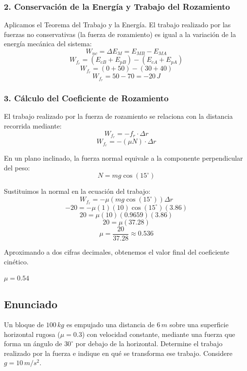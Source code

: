 \documentclass[12pt, a4paper]{article}
\begin{document}
\subsubsection*{2. Conservación de la Energía y Trabajo del Rozamiento}
Aplicamos el Teorema del Trabajo y la Energía. El trabajo realizado por las fuerzas no conservativas (la fuerza de rozamiento) es igual a la variación de la energía mecánica del sistema:
$$ W_{nc} = \Delta E_M = E_{MB} - E_{MA} $$
$$ W_{f_r} = (E_{cB} + E_{pB}) - (E_{cA} + E_{pA}) $$
$$ W_{f_r} = (0 + 50) - (30 + 40) $$
$$ W_{f_r} = 50 - 70 = -20 \, \si{J} $$

\subsubsection*{3. Cálculo del Coeficiente de Rozamiento}
El trabajo realizado por la fuerza de rozamiento se relaciona con la distancia recorrida mediante:
$$ W_{f_r} = -f_r \cdot \Delta r $$
$$ W_{f_r} = -(\mu N) \cdot \Delta r $$

En un plano inclinado, la fuerza normal equivale a la componente perpendicular del peso:
$$ N = mg \cos(15^\circ) $$

Sustituimos la normal en la ecuación del trabajo:
$$ W_{f_r} = -\mu (mg \cos(15^\circ)) \Delta r $$
$$ -20 = -\mu (1)(10)\cos(15^\circ)(3.86) $$
$$ 20 = \mu (10)(0.9659)(3.86) $$
$$ 20 = \mu (37.28) $$
$$ \mu = \frac{20}{37.28} \approx 0.536 $$

Aproximando a dos cifras decimales, obtenemos el valor final del coeficiente cinético.

\begin{tcolorbox}[colback=green!5!white, colframe=green!50!black, title=Respuesta Final]
\centering \Large $\mu = 0.54$
\end{tcolorbox}

\newpage

\subsection*{Enunciado}
Un bloque de $100 \, \si{kg}$ es empujado una distancia de $6 \, \si{m}$ sobre una superficie horizontal rugosa ($\mu = 0.3$) con velocidad constante, mediante una fuerza que forma un ángulo de $30^\circ$ por debajo de la horizontal. Determine el trabajo realizado por la fuerza e indique en qué se transforma ese trabajo. Considere $g = 10 \, \si{m/s^2}$.

\begin{center}
\end{center}
\end{document}
